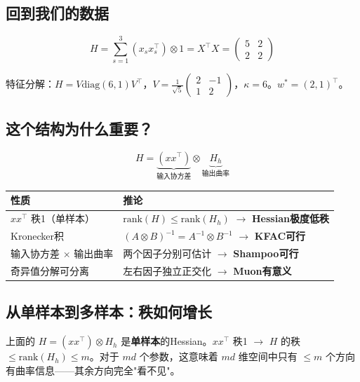 \documentclass[12pt,a4paper]{article}
\begin{document}
\subsection{回到我们的数据}


\[H = \sum_{s=1}^3 (x_s x_s^\top) \otimes 1 = X^\top X = \begin{pmatrix}5&2\\2&2\end{pmatrix}\]

特征分解：$H = V\text{diag}(6,1)V^\top$，$V = \frac{1}{\sqrt{5}}\begin{pmatrix}2&-1\\1&2\end{pmatrix}$，$\kappa = 6$。$w^* = (2,1)^\top$。


\subsection{这个结构为什么重要？}


\[H = \underbrace{(xx^\top)}_{\text{输入协方差}} \otimes \underbrace{H_h}_{\text{输出曲率}}\]







\begin{center}\small
\begin{longtable}{|l|l|}
\hline
性质 & 推论 \\
\hline
$xx^\top$ 秩1（单样本） & $\text{rank}(H) \le \text{rank}(H_h)$ $\to$ \textbf{Hessian极度低秩} \\
Kronecker积 & $(A \otimes B)^{-1} = A^{-1} \otimes B^{-1}$ $\to$ \textbf{KFAC可行} \\
输入协方差 $\times$ 输出曲率 & 两个因子分别可估计 $\to$ \textbf{Shampoo可行} \\
奇异值分解可分离 & 左右因子独立正交化 $\to$ \textbf{Muon有意义} \\
\hline
\end{longtable}
\end{center}

\subsection{从单样本到多样本：秩如何增长}

上面的 $H = (xx^\top) \otimes H_h$ 是\textbf{单样本}的Hessian。$xx^\top$ 秩1 $\to$ $H$ 的秩 $\le \text{rank}(H_h) \le m$。对于 $md$ 个参数，这意味着 $md$ 维空间中只有 $\le m$ 个方向有曲率信息——其余方向完全"看不见"。
\end{document}
